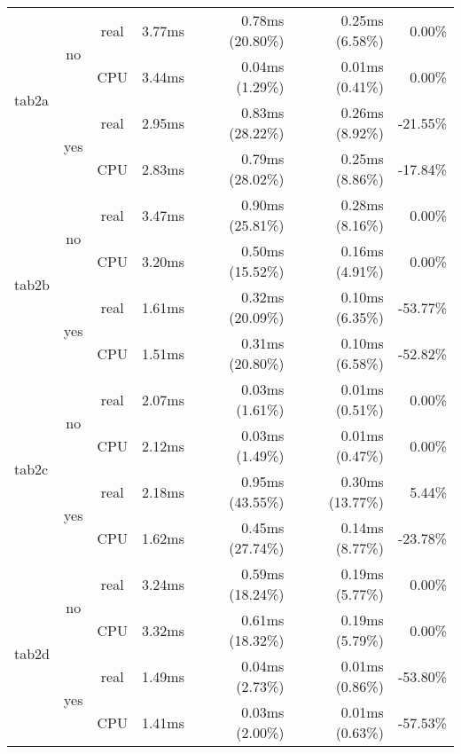 \documentclass[en]{pracamgr}
\begin{document}
\begin{small}
\begin{longtable}{|l|c|c|r|r|r|r|}
\hline
\multirow{4}{*}{tab2a}    & \multirow{2}{*}{no}  & real & 3.77ms & 0.78ms (20.80\%) & 0.25ms (6.58\%) & 0.00\% \\*
                          &                      & CPU  & 3.44ms & 0.04ms (1.29\%) & 0.01ms (0.41\%) & 0.00\% \\*
                          \cline{2-7}
                          & \multirow{2}{*}{yes} & real & 2.95ms & 0.83ms (28.22\%) & 0.26ms (8.92\%) & -21.55\% \\*
                          &                      & CPU  & 2.83ms & 0.79ms (28.02\%) & 0.25ms (8.86\%) & -17.84\% \\
\hline
\multirow{4}{*}{tab2b}    & \multirow{2}{*}{no}  & real & 3.47ms & 0.90ms (25.81\%) & 0.28ms (8.16\%) & 0.00\% \\*
                          &                      & CPU  & 3.20ms & 0.50ms (15.52\%) & 0.16ms (4.91\%) & 0.00\% \\*
                          \cline{2-7}
                          & \multirow{2}{*}{yes} & real & 1.61ms & 0.32ms (20.09\%) & 0.10ms (6.35\%) & -53.77\% \\*
                          &                      & CPU  & 1.51ms & 0.31ms (20.80\%) & 0.10ms (6.58\%) & -52.82\% \\
\hline
\multirow{4}{*}{tab2c}    & \multirow{2}{*}{no}  & real & 2.07ms & 0.03ms (1.61\%) & 0.01ms (0.51\%) & 0.00\% \\*
                          &                      & CPU  & 2.12ms & 0.03ms (1.49\%) & 0.01ms (0.47\%) & 0.00\% \\*
                          \cline{2-7}
                          & \multirow{2}{*}{yes} & real & 2.18ms & 0.95ms (43.55\%) & 0.30ms (13.77\%) & 5.44\% \\*
                          &                      & CPU  & 1.62ms & 0.45ms (27.74\%) & 0.14ms (8.77\%) & -23.78\% \\
\hline
\multirow{4}{*}{tab2d}    & \multirow{2}{*}{no}  & real & 3.24ms & 0.59ms (18.24\%) & 0.19ms (5.77\%) & 0.00\% \\*
                          &                      & CPU  & 3.32ms & 0.61ms (18.32\%) & 0.19ms (5.79\%) & 0.00\% \\*
                          \cline{2-7}
                          & \multirow{2}{*}{yes} & real & 1.49ms & 0.04ms (2.73\%) & 0.01ms (0.86\%) & -53.80\% \\*
                          &                      & CPU  & 1.41ms & 0.03ms (2.00\%) & 0.01ms (0.63\%) & -57.53\% \\

\end{longtable}
\end{small}
\end{document}
